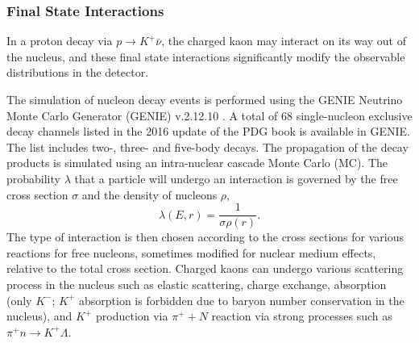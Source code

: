\subsubsection{Final State Interactions}
\label{sec:final-state-interactions}

In a proton decay via $p\rightarrow K^{+} \bar{\nu}$, the charged kaon may interact on its way out of the nucleus, and these final state interactions significantly modify the observable distributions in the detector. 

The simulation of nucleon decay events is performed using the GENIE Neutrino Monte Carlo Generator (GENIE) \cite{genie} v.2.12.10 . A total of 68 single-nucleon exclusive decay channels listed in the 2016 update of the PDG book is available in GENIE. The list includes two-, three- and five-body decays. 
The propagation of the decay products is simulated using an intra-nuclear cascade Monte Carlo (MC). The probability $\lambda$ that a particle will undergo an interaction is governed by the free cross section $\sigma$ and the density of nucleons $\rho$,
\begin{equation}
\lambda(E,r)= \frac{1}{\sigma \rho(r)}.
\end{equation}
The type of interaction is then chosen according to the cross sections for various reactions for free nucleons, sometimes modified for nuclear medium effects, relative to the total cross section. Charged kaons can undergo various scattering process in the nucleus such as elastic scattering, charge exchange, absorption (only $K^{-}$; $K^{+}$ absorption is forbidden due to baryon number conservation in the nucleus), and $K^{+}$ production via $\pi^{+}+N$ reaction via strong processes such as $\pi^{+}n \rightarrow K^{+} \Lambda$.

